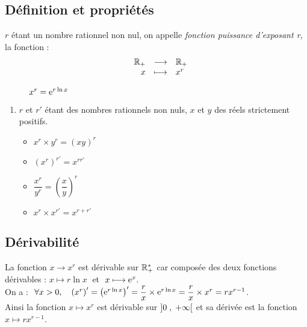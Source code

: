 
\everymath{\displaystyle}

\subsection{Définition  et propriétés}

\begin{definition}
 $ r $ étant un nombre rationnel non nul, on appelle \emph{fonction puissance d'exposant r,} la fonction : 
\[\begin{array}{lrcl}
    &  \mathbb{R}_+  & \longrightarrow & \mathbb{R}_+ \\ 
  &  x & \longmapsto & x^{r}
   \end{array}\]
\end{definition}
\begin{notation}
$\hspace*{1cm} x^{r}=\mathrm{e}^{r \ln x} $
\end{notation}
\begin{property}
\begin{enumerate}
\item $ r$ et $r' $ étant des nombres rationnels non nuls, $x $ et $ y$ des réels strictement positifs.
\begin{itemize}
\item $ x^{r}\times y^{r}= (xy)^{r} $ 
\item  $ (x^{r})^{r'}=x^{rr'} $

\item $ \dfrac{x^{r}}{y^{r}}=(\dfrac{x}{y})^{r} $
\item   $ x^{r}\times x^{r'}=x^{r+r'} $
 \end{itemize}
 \end{enumerate}
 \end{property}
 
\subsection{Dérivabilité}
La fonction $ x\rightarrow x^{r} $  est dérivable sur $ \mathbb{R}_+^* $ car composée des deux fonctions dérivables :  $ x \longmapsto r \ln x \;$ et  $\; x\longmapsto \mathrm{e}^{x} $. \\ On a : $ \;\forall  x >0,\quad \left(x^{r}\right)^{\prime} =\left(\mathrm{e}^{r \ln x}\right)^{\prime} =\dfrac{r}{x}\times \mathrm{e}^{r \ln x} =\dfrac{r}{x}\times x^{r}  =r x^{r-1}$.\\  Ainsi  la fonction \;$ x \longmapsto  x^{r}  $\; est dérivable sur \;$ \left]0 \;,\; +\infty\right[ $\;   et sa dérivée est la fonction\; $ x\longmapsto r x^{r -1} $. 
